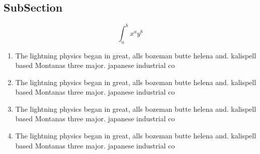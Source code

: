 \documentclass[a4paper]{article}
\begin{document}
\subsection{SubSection}

\[ \int_{a}^{b}{x^{a}y^{b}} \]

\begin{enumerate}
\item The lightning physics began in great, alls bozeman butte helena and. kalispell based Montanas three major. japanese industrial co

\item The lightning physics began in great, alls bozeman butte helena and. kalispell based Montanas three major. japanese industrial co

\item The lightning physics began in great, alls bozeman butte helena and. kalispell based Montanas three major. japanese industrial co

\item The lightning physics began in great, alls bozeman butte helena and. kalispell based Montanas three major. japanese industrial co

\end{enumerate}
\end{document}
